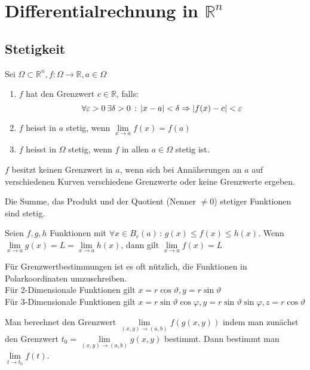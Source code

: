 \section{Differentialrechnung in $\mathbb{R}^n$}
	\subsection{Stetigkeit}
		\begin{definition}
			Sei $\Omega \subset \mathbb{R}^n, f: \Omega \to \mathbb{R}, a \in \Omega$
			\begin{enumerate}
				\item $f$ hat den Grenzwert $c \in \mathbb{R}$, falls:
				$$ \forall \varepsilon > 0 \, \exists \delta > 0 \, : \, \left\vert x-a \right\vert < \delta \Rightarrow \left\vert f(x) - c \right\vert < \varepsilon$$
				\item $f$ heisst in $a$ stetig, wenn $\lim\limits_{x \to a} f(x) = f(a)$
				\item $f$ heisst in $\Omega$ stetig, wenn $f$ in allen $a \in \Omega$ stetig ist.
			\end{enumerate}
		\end{definition}
		\begin{proofhelp}
			$f$ besitzt keinen Grenzwert in $a$, wenn sich bei Annäherungen an $a$ auf verschiedenen Kurven verschiedene Grenzwerte oder keine Grenzwerte ergeben.
		\end{proofhelp}
		\begin{proofhelp}
			Die Summe, das Produkt und der Quotient (Nenner $\neq 0$) stetiger Funktionen sind stetig.
		\end{proofhelp}
		\begin{proofhelp}
			Seien $f,g,h$ Funktionen mit $\forall x \in B_r(a) \, : \, g(x) \leq f(x) \leq h(x)$. Wenn $\lim\limits_{x \to a} g(x) = L =\lim\limits_{x \to a} h(x)$, dann gilt $\lim\limits_{x \to a} f(x) = L$
		\end{proofhelp}
		\begin{hint}[Polarkoordinaten]
			Für Grenzwertbestimmungen ist es oft nützlich, die Funktionen in Polarkoordinaten umzuschreiben. \\
			Für 2-Dimensionale Funktionen gilt $x = r \cos \vartheta , y = r \sin \vartheta$ \\
			Für 3-Dimensionale Funktionen gilt $x = r \sin \vartheta \cos \varphi , y = r \sin \vartheta \sin \varphi , z = r \cos \vartheta $
		\end{hint}
		\begin{hint}[Substitution]
			Man berechnet den Grenzwert $\lim\limits_{(x,y) \to (a,b)} f(g(x,y))$ indem man zunächst den Grenzwert $t_0 = \lim\limits_{(x,y) \to (a,b)} g(x,y)$ bestimmt. Dann bestimmt man $\lim\limits_{t \to t_0} f(t)$.
		\end{hint}
